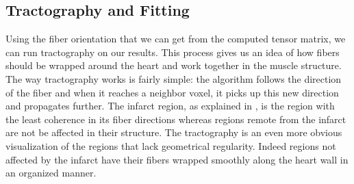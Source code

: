 \subsection{Tractography and Fitting}

Using the fiber orientation that we can get from the computed tensor matrix, we can run tractography on our results. This process gives us an idea of how fibers should be wrapped around the heart and work together in the muscle structure. The way tractography works is fairly simple: the algorithm follows the direction of the fiber and when it reaches a neighbor voxel, it picks up this new direction and propagates further. The infarct region, as explained in \cite{wu2007mr}, is the region with the least coherence in its fiber directions whereas regions remote from the infarct are not be affected in their structure. The tractography is an even more obvious visualization of the regions that lack geometrical regularity. Indeed regions not affected by the infarct have their fibers wrapped smoothly along the heart wall in an organized manner.

